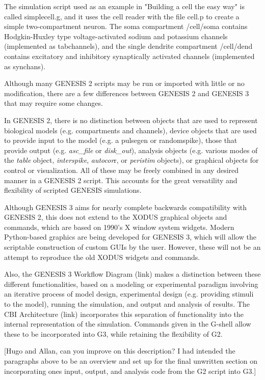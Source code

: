 \documentclass[12pt]{article}
\begin{document}
The simulation script used as an example in "Building a cell the easy
way" is called simplecell.g, and it uses the cell reader with the file
cell.p to create a simple two-compartment neuron.  The soma
compartment /cell/soma contains Hodgkin-Huxley type voltage-activated
sodium and potassium channels (implemented as tabchannels), and the single
dendrite compartment /cell/dend contains excitatory and inhibitory
synaptically activated channels (implemented as synchans).

Although many GENESIS 2 scripts may be run or imported with little or no
modification, there are a few differences between GENESIS 2 and GENESIS 3
that may require some changes.

In GENESIS 2, there is no distinction between objects that are used to
represent biological models (e.g. compartments and channels), device
objects that are used to provide input to the model (e.g. a pulsegen or
randomspike), those that provide output (e.g. {\it asc\_file} or {\it disk\_out}),
analysis objects (e.g. various modes of the {\it table} object, {\it interspike},
{\it autocor}r, or {\it peristim} objects), or graphical objects for control or
visualization.  All of these may be freely combined in any desired
manner in a GENESIS 2 script.  This accounts for the great versatility
and flexibility of scripted GENESIS simulations.

Although GENESIS 3 aims for nearly complete backwards compatibility
with GENESIS 2, this does not extend to the XODUS graphical objects and
commands, which are based on 1990's X window system widgets.  Modern
Python-based graphics are being developed for GENESIS 3, which will
allow the scriptable construction of custom GUIs by the user.
However, these will not be an attempt to reproduce the old XODUS
widgets and commands.

Also, the GENESIS 3 Workflow Diagram (link) makes a distinction between
these different functionalities, based on a modeling or experimental
paradigm involving an iterative process of model design, experimental
design (e.g. providing stimuli to the model), running the simulation, and
output and analysis of results.  The CBI Architecture (link) incorporates
this separation of functionality into the internal representation of the
simulation.  Commands given in the G-shell allow these to be incorporated
into G3, while retaining the flexibility of G2.

[Hugo and Allan, can you improve on this description?  I had intended
 the paragraphs above to be an overview and set up for the final
 unwritten section on incorporating ones input, output, and analysis
 code from the G2 script into G3.]
\end{document}
